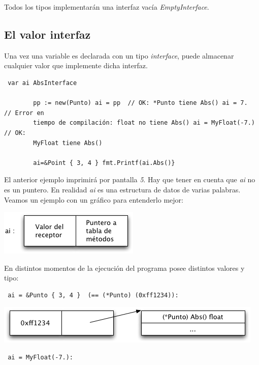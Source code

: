 	Todos los tipos implementarán una interfaz vacía \textit{EmptyInterface}.
	
	\subsection{El valor interfaz}
	
	Una vez una variable es declarada con un tipo \textit{interface}, puede
	almacenar cualquier valor que implemente dicha interfaz.
	
	\begin{verbatim} var ai AbsInterface
	    
		pp := new(Punto) ai = pp  // OK: *Punto tiene Abs() ai = 7.  // Error en
		tiempo de compilación: float no tiene Abs() ai = MyFloat(-7.) // OK:
		MyFloat tiene Abs()
	    
		ai=&Point { 3, 4 } fmt.Printf(ai.Abs()} \end{verbatim}
	
	El anterior ejemplo imprimirá por pantalla \textit{5}. Hay que tener en
	cuenta que \textit{ai} no es un puntero. En realidad \textit{ai} es una
	estructura de datos de varias palabras. Veamos un ejemplo con un gráfico
	para entenderlo mejor:
	
	\begin{center} \includegraphics{oo/interface_value1.png} \end{center}
	
	En distintos momentos de la ejecución del programa posee distintos valores
	y tipo:
	
	\begin{verbatim} ai = &Punto { 3, 4 }  (== (*Punto) (0xff1234)):
	\end{verbatim}
	
	\begin{center} \includegraphics{oo/interface_value2.png} \end{center}
	
	\begin{verbatim} ai = MyFloat(-7.): \end{verbatim}
	
